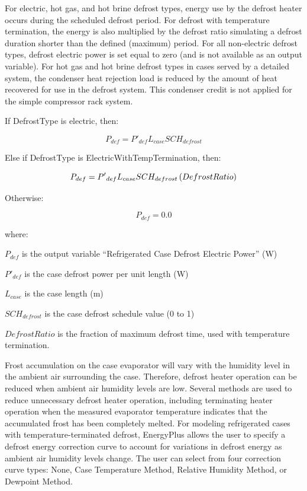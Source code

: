 For electric, hot gas, and hot brine defrost types, energy use by the defrost heater occurs during the scheduled defrost period. For defrost with temperature termination, the energy is also multiplied by the defrost ratio simulating a defrost duration shorter than the defined (maximum) period. For all non-electric defrost types, defrost electric power is set equal to zero (and is not available as an output variable). For hot gas and hot brine defrost types in cases served by a detailed system, the condenser heat rejection load is reduced by the amount of heat recovered for use in the defrost system. This condenser credit is not applied for the simple compressor rack system.

If DefrostType is electric, then:

\begin{equation}
  P_{def} = {P'}_{def} L_{case} SCH_{defrost}
\end{equation}

Else if DefrostType is ElectricWithTempTermination, then:

\begin{equation}
  P_{def} = {P'}_{def} L_{case} SCH_{defrost} \left(DefrostRatio\right)
\end{equation}

Otherwise:

\begin{equation}
  P_{def} = 0.0
\end{equation}

where:

\({P_{def}}\) is the output variable ``Refrigerated Case Defrost Electric Power'' (W)

\({P'}_{def}\) is the case defrost power per unit length (W)

\({L_{case}}\) is the case length (m)

\(SC{H_{defrost}}\) is the case defrost schedule value (0 to 1)

\(DefrostRatio\) is the fraction of maximum defrost time, used with temperature termination.

Frost accumulation on the case evaporator will vary with the humidity level in the ambient air surrounding the case. Therefore, defrost heater operation can be reduced when ambient air humidity levels are low. Several methods are used to reduce unnecessary defrost heater operation, including terminating heater operation when the measured evaporator temperature indicates that the accumulated frost has been completely melted. For modeling refrigerated cases with temperature-terminated defrost, EnergyPlus allows the user to specify a defrost energy correction curve to account for variations in defrost energy as ambient air humidity levels change. The user can select from four correction curve types: None, Case Temperature Method, Relative Humidity Method, or Dewpoint Method.

